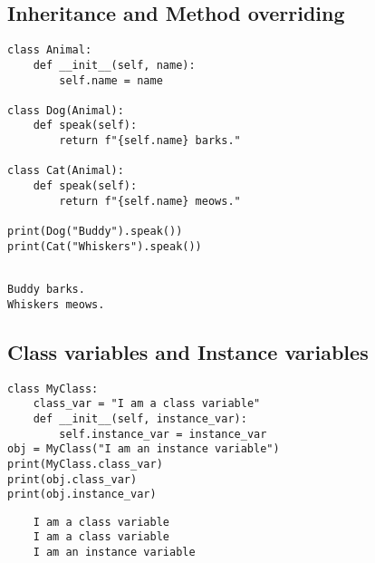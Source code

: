 \subsection{Inheritance and Method overriding}
\vspace{-.6cm}
\begin{code}[h]
\begin{lstlisting}
class Animal:
    def __init__(self, name):
        self.name = name

class Dog(Animal):
    def speak(self):
        return f"{self.name} barks."

class Cat(Animal):
    def speak(self):
        return f"{self.name} meows."

print(Dog("Buddy").speak())  
print(Cat("Whiskers").speak())


\end{lstlisting}
\end{code}
\vspace{-.4cm}
\begin{verbatim}
Buddy barks.
Whiskers meows.
\end{verbatim}
\subsection{Class variables and Instance variables}
\vspace{-.6cm}
\begin{code}
\begin{lstlisting}
class MyClass:
    class_var = "I am a class variable"
    def __init__(self, instance_var):
        self.instance_var = instance_var
obj = MyClass("I am an instance variable")
print(MyClass.class_var)  
print(obj.class_var)     
print(obj.instance_var)   
\end{lstlisting}
\end{code}
\begin{verbatim}
    I am a class variable
    I am a class variable
    I am an instance variable

\end{verbatim}



 
